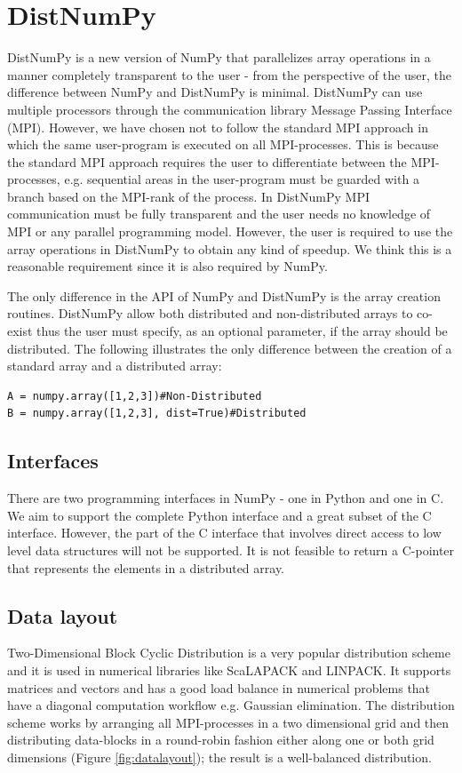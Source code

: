 \documentclass{sigplanconf}
\begin{document}
\section{DistNumPy}
DistNumPy is a new version of NumPy that parallelizes array operations in a manner completely transparent to the user - from the perspective of the user, the difference between NumPy and DistNumPy is minimal. DistNumPy can use multiple processors through the communication library Message Passing Interface (MPI)\cite{mpi}. However, we have chosen not to follow the standard MPI approach in which the same user-program is executed on all MPI-processes. This is because the standard MPI approach requires the user to differentiate between the MPI-processes, e.g. sequential areas in the user-program must be guarded with a branch based on the MPI-rank of the process. In DistNumPy MPI communication must be fully transparent and the user needs no knowledge of MPI or any parallel programming model. However, the user is required to use the array operations in DistNumPy to obtain any kind of speedup. We think this is a reasonable requirement since it is also required by NumPy.

The only difference in the API of NumPy and DistNumPy is the array creation routines. DistNumPy allow both distributed and non-distributed arrays to co-exist thus the user must specify, as an optional parameter, if the array should be distributed. The following illustrates the only difference between the creation of a standard array and a distributed array:
\lstset{frame=none, xleftmargin=0mm, numbers=none}
\begin{lstlisting}
A = numpy.array([1,2,3])#Non-Distributed
B = numpy.array([1,2,3], dist=True)#Distributed
\end{lstlisting}
\lstset{frame=single, xleftmargin=5mm, numbers=left}


\subsection{Interfaces}
There are two programming interfaces in NumPy - one in Python and one in C. We aim to support the complete Python interface and a great subset of the C interface. However, the part of the C interface that involves direct access to low level data structures will not be supported. It is not feasible to return a C-pointer that represents the elements in a distributed array.


\subsection{Data layout}
Two-Dimensional Block Cyclic Distribution is a very popular distribution scheme and it is used in numerical libraries like ScaLAPACK\cite{Blackford96} and LINPACK\cite{linpack79}. It supports matrices and vectors and has a good load balance in numerical problems that have a diagonal computation workflow e.g. Gaussian elimination. The distribution scheme works by arranging all MPI-processes in a two dimensional grid and then distributing data-blocks in a round-robin fashion either along one or both grid dimensions (Figure \ref {fig:datalayout}); the result is a well-balanced distribution.
\end{document}
